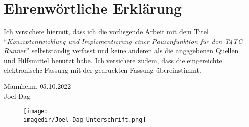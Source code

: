 \clearpage
\chapter*{Ehrenwörtliche Erklärung}


Ich versichere hiermit, dass ich die vorliegende Arbeit mit dem Titel ``\textit{Konzeptentwicklung und Implementierung einer Pausenfunktion für den T4TC-Runner}'' selbstständig verfasst und 
keine anderen als die angegebenen Quellen und Hilfsmittel benutzt habe. Ich versichere zudem, dass die eingereichte elektronische 
Fassung mit der gedruckten Fassung übereinstimmt.

\vspace{2cm}
Mannheim, 05.10.2022 \\
\hfill Joel Dag
\begin{figure}[H]
	\texttt{[image: \\imagedir/Joel\_Dag\_Unterschrift.png]}
	\label{GUI}
\end{figure}

